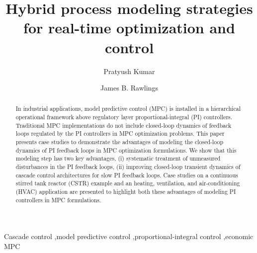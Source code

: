 \documentclass[preprint,5p, twocolumn, authoryear]{elsarticle}
\begin{document}
\begin{frontmatter}


\title{Hybrid process modeling strategies for real-time optimization and control}

\author[label1]{Pratyush Kumar}

\author[label1]{James B. Rawlings}

\address[label1]{Department of Chemical Engineering, University of California,
        Santa Barbara, CA 93106, United States} 
                
\begin{abstract}

In industrial applications, model predictive control (MPC) is installed in a
hierarchical operational framework above regulatory layer proportional-integral
(PI) controllers. Traditional MPC implementations do not include closed-loop
dynamics of feedback loops regulated by the PI controllers in MPC optimization
problems. This paper presents case studies to demonstrate the advantages of
modeling the closed-loop dynamics of PI feedback loops in MPC optimization
formulations. We show that this modeling step has two key advantages, (i)
systematic treatment of unmeasured disturbances in the PI feedback loops, (ii)
improving closed-loop transient dynamics of cascade control architectures for
slow PI feedback loops. Case studies on a continuous stirred tank reactor (CSTR)
example and an heating, ventilation, and air-conditioning (HVAC) application are
presented to highlight both these advantages of modeling PI controllers in MPC
formulations. 

\end{abstract}

\begin{keyword}
Cascade control \sep model predictive control \sep proportional-integral control
\sep economic MPC
\end{keyword}

\end{frontmatter}
\end{document}
